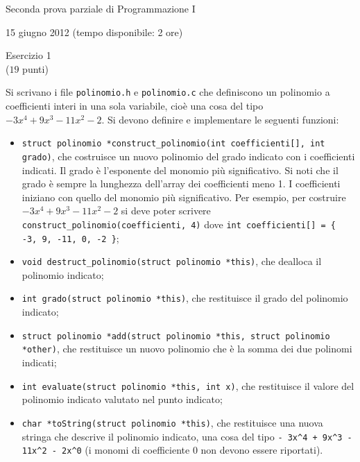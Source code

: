 \documentclass[italian,12pt]{article}
\begin{document}
\begin{center}{\LARGE Seconda prova parziale di Programmazione I}\\
\begin{center}
  \Large 15 giugno 2012 (tempo disponibile: 2 ore)
\end{center}
\end{center}
\vspace*{2ex}
\begin{center}{\Large Esercizio 1}\\
($19$ punti)
\end{center}
Si scrivano i file \texttt{polinomio.h} e \texttt{polinomio.c} che definiscono un polinomio
a coefficienti interi in una sola variabile, cio\`e una cosa del tipo
$-3x^4 + 9x^3 - 11x^2 - 2$. Si devono definire e implementare le seguenti funzioni:
%
\begin{itemize}
\item \texttt{struct polinomio *construct\_polinomio(int coefficienti[], int grado)}, che costruisce
      un nuovo polinomio del grado indicato con i coefficienti indicati. Il grado \`e l'esponente del
      monomio pi\`u significativo. Si noti che il grado \`e
      sempre la lunghezza dell'array dei coefficienti meno 1. I coefficienti iniziano con quello
      del monomio pi\`u significativo. Per esempio, per costruire
      $-3x^4 + 9x^3 - 11x^2 - 2$ si deve poter scrivere
      \texttt{construct\_polinomio(coefficienti, 4)} dove
      \verb!int coefficienti[] = { -3, 9, -11, 0, -2 }!;
\item \texttt{void destruct\_polinomio(struct polinomio *this)}, che dealloca il polinomio indicato;
\item \texttt{int grado(struct polinomio *this)}, che restituisce il grado del polinomio indicato;
\item \texttt{struct polinomio *add(struct polinomio *this, struct polinomio *other)}, che resti\-tui\-sce un
      nuovo polinomio che \`e la somma dei due polinomi indicati;
\item \texttt{int evaluate(struct polinomio *this, int x)}, che restituisce il valore del polinomio indicato
      valutato nel punto indicato;
\item \texttt{char *toString(struct polinomio *this)}, che restituisce una nuova stringa che descrive
      il polinomio indicato, una cosa del tipo \verb!- 3x^4 + 9x^3 - 11x^2 - 2x^0! (i monomi di coefficiente
      0 non devono essere riportati).
\end{itemize}
\end{document}
